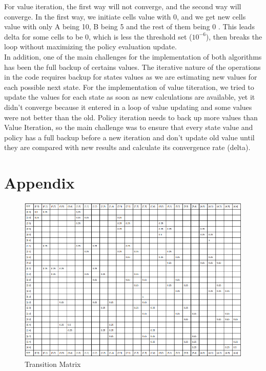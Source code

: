 \documentclass[11pt]{article}
\begin{document}
\noindent
For value iteration, the first way will not converge, and the second way will
converge.  In the first way, we initiate cells value with 0, and we get new
cells value with only A being 10, B being 5 and the rest of them being 0 . This
leads delta for some cells to be 0, which is less the threshold set ($10^{-6}$),
then breaks the loop without maximizing the policy evaluation update. \\

\noindent
In addition, one of the main challenges for the implementation of both algorithms
has been the full backup of certains values. The iterative nature of the
operations in the code requires backup for states values as we are estimating
new values for each possible next state. For the implementation of value
titeration, we tried to update the values for each state as soon as new
calculations are available, yet it didn’t converge because it entered in a loop
of value updating and some values were not better than the old. Policy iteration
needs to back up more values than Value Iteration, so the main challenge was to
ensure that every state value and policy has a full backup before a new
iteration and don’t update old value until they are compared with new results
and calculate its convergence rate (delta). \\

\newpage
\section{Appendix}

\begin{figure}[h]
\includegraphics[scale=0.5]{transition_matrix}
\centering
\caption{Transition Matrix}
\end{figure}
\end{document}
